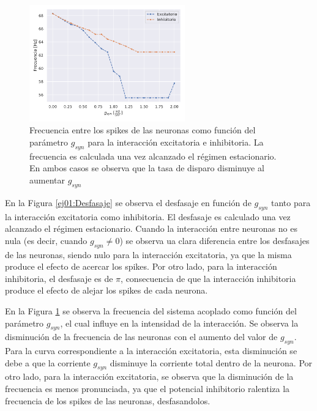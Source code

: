 \begin{figure}[h!]
    \centering
    \includegraphics[width=0.6\textwidth]{Tasa_de_Disparo.pdf}
    \caption{Frecuencia entre los spikes de las neuronas como función del parámetro $g_{syn}$ para la interacción excitatoria e inhibitoria. La frecuencia es calculada una vez alcanzado el régimen estacionario. En ambos casos se observa que la tasa de disparo disminuye al aumentar $g_{syn}$}
    \label{ej01:tasaDeDisparo}
\end{figure}

En la Figura \ref{ej01:Desfasaje} se observa el desfasaje en función de $g_{syn}$ tanto para la interacción excitatoria como inhibitoria. El desfasaje es calculado una vez alcanzado el régimen estacionario. Cuando la interacción entre neuronas no es nula (es decir, cuando $g_{syn} \neq 0$) se observa ua clara diferencia entre los desfasajes de las neuronas, siendo nulo para la interacción excitatoria, ya que la misma produce el efecto de acercar los spikes. Por otro lado, para la interacción inhibitoria, el desfasaje es de $\pi$, consecuencia de que la interacción inhibitoria produce el efecto de alejar los spikes de cada neurona.

En la Figura \ref{ej01:tasaDeDisparo} se observa la frecuencia del sistema acoplado como función del parámetro $g_{syn}$, el cual influye en la intensidad de la interacción. Se observa la disminución de la frecuencia de las neuronas con el aumento del valor de $g_{syn}$. Para la curva correspondiente a la interacción excitatoria, esta disminución se debe a que la corriente $g_{syn}$ disminuye la corriente total dentro de la neurona. Por otro lado, para la interacción excitatoria, se observa que la disminución de la frecuencia es menos pronunciada, ya que el potencial inhibitorio ralentiza la frecuencia de los spikes de las neuronas, desfasandolos.
